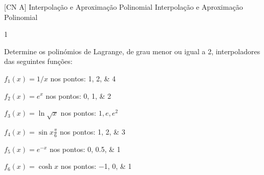 \documentclass["CN_A-Exercises_Resolutions.tex"]{subfiles}
\begin{document}
\graphicspath{{\subfix{./.build/figures/CN_A-Exercises_Resolutions.2023.2}}}

 [CN A]
{Interpolação e Aproximação Polinomial} %
{Interpolação e Aproximação Polinomial} %

\setcounter{question}{1}
\begin{questionBox}1{} %

  Determine os polinómios de Lagrange, de grau menor ou igual a 2, interpoladores das seguintes funções:
\begin{enumerate}[label=\alph{enumi})]
  \begin{multicols}{2}
    \item \(f_1(x) = 1/x\) nos pontos: \numlist*{1;2;4}
    \item \(f_2(x) = e^x\) nos pontos: \numlist*{0;1;2}
    \item \(f_3(x) = \ln{\sqrt{x}}\) nos pontos: \(1,e,e^2\)
    \item \(f_4(x) = \sin{x\frac{\pi}{6}}\) nos pontos: \numlist*{1;2;3}
    \item \(f_5(x) = e^{-x}\) nos pontos: \numlist*{0;0.5;1}
    \item \(f_6(x) = \cosh{x}\) nos pontos: \numlist*{-1;0;1}
    \end{multicols}
\end{enumerate}

\end{questionBox}
\end{document}

